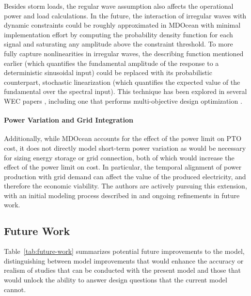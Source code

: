 Besides storm loads, the regular wave assumption also affects the operational power and load calculations.
In the future, the interaction of irregular waves with dynamic constraints could be roughly approximated in MDOcean with minimal implementation effort by computing the probability density function for each signal and saturating any amplitude above the constraint threshold.
To more fully capture nonlinearities in irregular waves, the describing function mentioned earlier (which quantifies the fundamental amplitude of the response to a deterministic sinusoidal input) could be replaced with its probabilistic counterpart, stochastic linearization (which quantifies the expected value of the fundamental over the spectral input).
This technique has been explored in several WEC papers \cite{da_silva_statistical_2020,da_silva_stochastic_2023,kluger_synergistic_2017,folley_spectral-domain_2016,spanos_efficient_2016}, including one that performs multi-objective design optimization \cite{neshat_enhancing_2024}.

\paragraph{Power Variation and Grid Integration}
Additionally, while MDOcean accounts for the effect of the power limit on PTO cost, it does not directly model short-term power variation as would be necessary for sizing energy storage or grid connection, both of which would increase the effect of the power limit on cost.
In particular, the temporal alignment of power production with grid demand can affect the value of the produced electricity, and therefore the economic viability.
The authors are actively pursuing this extension, with an initial modeling process described in \cite{mccabe_wec_2025} and ongoing refinements in future work.


\subsection{Future Work}
Table~\ref{tab:future-work} summarizes potential future improvements to the model, distinguishing between model improvements that would enhance the accuracy or realism of studies that can be conducted with the present model and those that would unlock the ability to answer design questions that the current model cannot.

